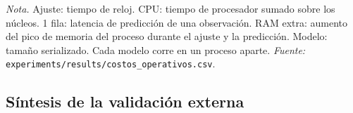 \documentclass[11pt,a4paper]{article}
\newcommand{\nota}[1]{\par\smallskip\raggedright\footnotesize\textit{Nota.} #1}
\begin{document}
\begin{table}[htbp]
  \centering
  \caption{Costo de cómputo en el corte más grande de la matrícula}\label{tab:costos}
  \small
  
  \nota{Ajuste: tiempo de reloj. CPU: tiempo de procesador sumado sobre los núcleos. 1 fila: latencia de
  predicción de una observación. RAM extra: aumento del pico de memoria del proceso durante el ajuste y la
  predicción. Modelo: tamaño serializado. Cada modelo corre en un proceso aparte. \textit{Fuente:}
  \texttt{experiments/results/costos\_operativos.csv}.}
\end{table}

\subsection{Síntesis de la validación externa}
\end{document}
